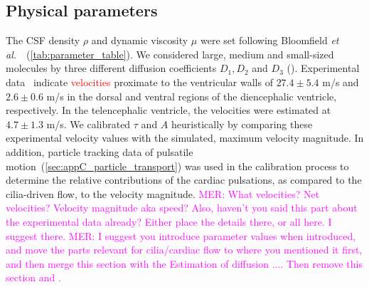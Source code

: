 \documentclass[fleqn]{wlscirep}
\newcommand{\mer}[1]{\textcolor{magenta}{#1}}
\newcommand{\fixme}[1]{\textcolor{red}{#1}}
\begin{document}
\subsection*{Physical parameters}
The CSF density $\rho$ and dynamic viscosity $\mu$ were set following Bloomfield \textit{et al.}~\cite{Bloomfield1998EffectsFluid}~(\cref{tab:parameter_table}). We considered large, medium and small-sized molecules by three different diffusion coefficients $D_1, D_2$ and $D_3$ (). Experimental data~\cite{Olstad2019CiliaryDevelopment} indicate \fixme{velocities} proximate to the ventricular walls of $27.4 \pm 5.4$ \textmu m/s and $2.6 \pm 0.6$ \textmu m/s in the dorsal and ventral regions of the diencephalic ventricle, respectively. In the telencephalic ventricle, the velocities were estimated at $4.7 \pm 1.3$ \textmu m/s. We calibrated $\tau$ and $A$ heuristically by comparing these experimental velocity values with the simulated, maximum velocity magnitude. In addition, particle tracking data of pulsatile motion~(\cref{sec:appC_particle_transport}) was used in the calibration process to determine the relative contributions of the cardiac pulsations, as compared to the cilia-driven flow, to the velocity magnitude.
\mer{MER: What velocities? Net velocities? Velocity magnitude aka speed? Also, haven't you said this part about the experimental data already? Either place the details there, or all here. I suggest there.}
\mer{MER: I suggest you introduce parameter values when introduced, and move the parts relevant for cilia/cardiac flow to where you mentioned it first, and then merge this section with the Estimation of diffusion .... Then remove this section and \Cref{tab:parameter_table}.}
\end{document}
